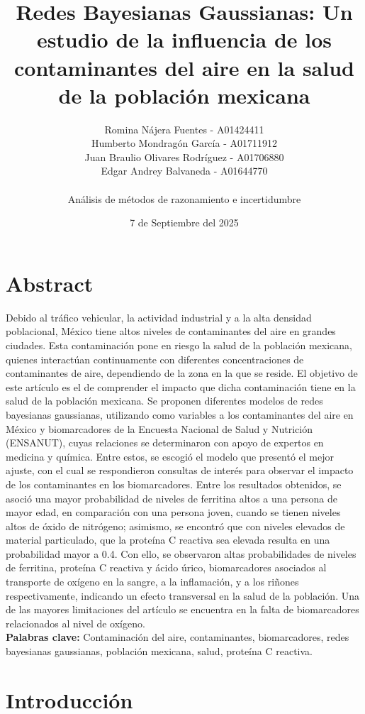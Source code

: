 \documentclass[12pt, letterpaper]{report}
\title{Redes Bayesianas Gaussianas: Un estudio de la influencia de los contaminantes del aire en la salud de la población mexicana}
\author{ Romina Nájera Fuentes - A01424411 \\ Humberto Mondragón García - A01711912 \\ Juan Braulio Olivares Rodríguez - A01706880 \\ Edgar Andrey Balvaneda - A01644770
 \\ \\ Análisis de métodos de razonamiento e incertidumbre}
\date{7 de Septiembre del 2025}
\begin{document}
\maketitle
\section*{Abstract}

Debido al tráfico vehicular, la actividad industrial y a la alta densidad poblacional, México tiene altos niveles de contaminantes del aire en grandes ciudades. Esta contaminación pone en riesgo la salud de la población mexicana, quienes interactúan continuamente con diferentes concentraciones de contaminantes de aire, dependiendo de la zona en la que se reside. El objetivo de este artículo es el de comprender el impacto que dicha contaminación tiene en la salud de la población mexicana. Se proponen diferentes modelos de redes bayesianas gaussianas, utilizando como variables a los contaminantes del aire en México y biomarcadores de la Encuesta Nacional de Salud y Nutrición (ENSANUT), cuyas relaciones se determinaron con apoyo de expertos en medicina y química. Entre estos, se escogió el modelo que presentó el mejor ajuste, con el cual se respondieron consultas de interés para observar el impacto de los contaminantes en los biomarcadores. Entre los resultados obtenidos, se asoció una mayor probabilidad de niveles de ferritina altos a una persona de mayor edad, en comparación con una persona joven, cuando se tienen niveles altos de óxido de nitrógeno; asimismo, se encontró que con niveles elevados de material particulado, que la proteína C reactiva sea elevada resulta en una probabilidad mayor a 0.4. Con ello, se observaron altas probabilidades de niveles de ferritina, proteína C reactiva y ácido úrico, biomarcadores asociados al transporte de oxígeno en la sangre, a la inflamación, y a los riñones respectivamente, indicando un efecto transversal en la salud de la población. Una de las mayores limitaciones del artículo se encuentra en la falta de biomarcadores relacionados al nivel de oxígeno.
\\

\textbf{Palabras clave:} Contaminación del aire, contaminantes, biomarcadores, redes bayesianas gaussianas, población mexicana, salud, proteína C reactiva.

\section*{Introducción}
\end{document}

